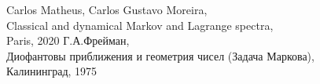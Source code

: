 \begin{thebibliography}{3}
	Carlos Matheus, Carlos Gustavo Moreira,\\
	Classical and dynamical Markov and Lagrange spectra,\\
	Paris, 2020
	Г.А.Фрейман,\\
	Диофантовы приближения и геометрия чисел (Задача Маркова),\\
	Калининград, 1975
\end{thebibliography}
